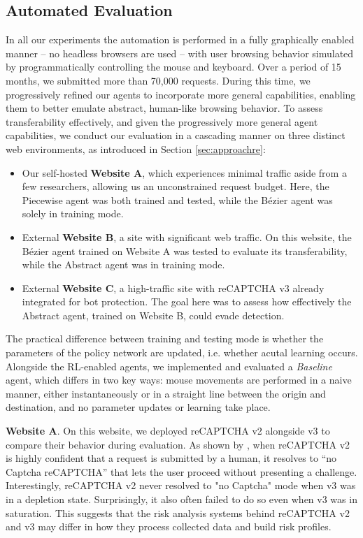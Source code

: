 \subsection{Automated Evaluation}
\label{sec:auto}

In all our experiments the automation is performed in a fully graphically enabled manner -- no headless browsers are used -- with user browsing behavior simulated by programmatically controlling the mouse and keyboard.
Over a period of 15 months, we submitted more than 70,000 requests.
During this time, we progressively refined our agents to incorporate more general capabilities, enabling them to better emulate abstract, human-like browsing behavior.
To assess transferability effectively, and given the progressively more general agent capabilities, we conduct our evaluation in a cascading manner on three distinct web environments, as introduced in Section \ref{sec:approachre}:

\begin{itemize}
    \item Our self-hosted \textbf{Website A}, which experiences minimal traffic aside from a few researchers, allowing us an unconstrained request budget. Here, the Piecewise agent was both trained and tested, while the Bézier agent was solely in training mode.
    \item External \textbf{Website B}, a site with significant web traffic. On this website, the Bézier agent trained on Website A was tested to evaluate its transferability, while the Abstract agent was in training mode.
    \item External \textbf{Website C}, a high-traffic site with reCAPTCHA v3 already integrated for bot protection. The goal here was to assess how effectively the Abstract agent, trained on Website B, could evade detection.
\end{itemize}

The practical difference between training and testing mode is whether the parameters of the policy network are updated, i.e. whether acutal learning occurs.
Alongside the RL-enabled agents, we implemented and evaluated a \textit{Baseline} agent, which differs in two key ways: mouse movements are performed in a naive manner, either instantaneously or in a straight line between the origin and destination, and no parameter updates or learning take place.

\textbf{Website A}. On this website, we deployed reCAPTCHA v2 alongside v3 to compare their behavior during evaluation.
As shown by \cite{sivakorn2016robot}, when reCAPTCHA v2 is highly confident that a request is submitted by a human, it resolves to ``no Captcha reCAPTCHA'' that lets the user proceed without presenting a challenge.
Interestingly, reCAPTCHA v2 never resolved to "no Captcha" mode when v3 was in a depletion state. Surprisingly, it also often failed to do so even when v3 was in saturation. This suggests that the risk analysis systems behind reCAPTCHA v2 and v3 may differ in how they process collected data and build risk profiles.

